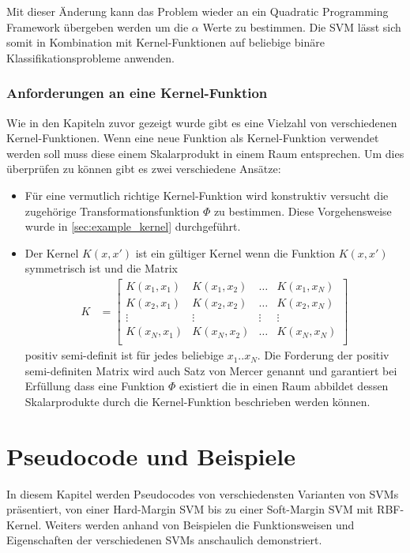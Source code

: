 \documentclass[a4paper,11pt,twoside]{scrreprt}
\begin{document}
Mit dieser Änderung kann das Problem wieder an ein Quadratic Programming Framework übergeben werden um die $\alpha$ Werte zu bestimmen. Die \ac{SVM} lässt sich somit in Kombination mit Kernel-Funktionen auf beliebige binäre Klassifikationsprobleme anwenden. 


\subsection{Anforderungen an eine Kernel-Funktion} \label{sec:kernel_conditions}
Wie in den Kapiteln zuvor gezeigt wurde gibt es eine Vielzahl von verschiedenen Kernel-Funktionen. Wenn eine neue Funktion als Kernel-Funktion verwendet werden soll muss diese einem Skalarprodukt in einem Raum entsprechen. Um dies überprüfen zu können gibt es zwei verschiedene Ansätze:

\begin{itemize}
	\item Für eine vermutlich richtige Kernel-Funktion wird konstruktiv versucht die zugehörige Transformationsfunktion $\Phi$ zu bestimmen. Diese Vorgehensweise wurde in \autoref{sec:example_kernel} durchgeführt.
	
	\item Der Kernel $K(x, x')$ ist ein gültiger Kernel wenn die Funktion $K(x, x')$ symmetrisch ist und die Matrix \[ 	
	\begin{aligned}
		K &= 
		\begin{bmatrix} 
			K(x_{1}, x_{1}) & K(x_{1}, x_{2}) & \dots & K(x_{1}, x_{N})\\
			K(x_{2}, x_{1}) & K(x_{2}, x_{2}) & \dots & K(x_{2}, x_{N})\\
			\vdots & \vdots & \vdots & \vdots\\
			K(x_{N}, x_{1}) & K(x_{N}, x_{2}) & \dots & K(x_{N}, x_{N})\\ 
		\end{bmatrix}
	\end{aligned}
\] positiv semi-definit ist für jedes beliebige $x_1..x_N$. Die Forderung der positiv semi-definiten Matrix wird auch Satz von Mercer genannt und garantiert bei Erfüllung dass eine Funktion $\Phi$ existiert die in einen Raum abbildet dessen Skalarprodukte durch die Kernel-Funktion beschrieben werden können. 
\end{itemize}


\chapter{Pseudocode und Beispiele} \label{ch:pseudobsp}
In diesem Kapitel werden Pseudocodes von verschiedensten Varianten von SVMs präsentiert, von einer Hard-Margin \ac{SVM} bis zu einer Soft-Margin \ac{SVM} mit \ac{RBF}-Kernel.
Weiters werden anhand von Beispielen die Funktionsweisen und Eigenschaften der verschiedenen SVMs anschaulich demonstriert.
\end{document}

